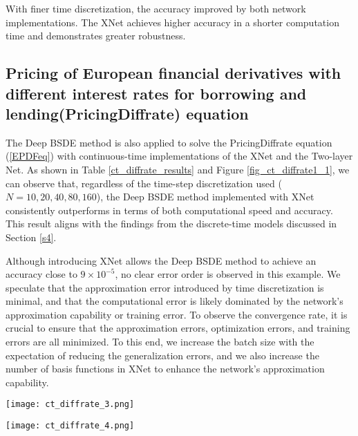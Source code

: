 \documentclass[11pt]{article}
\begin{document}
With finer time discretization, the accuracy improved by both network implementations. The XNet achieves higher accuracy in a shorter computation time and demonstrates greater robustness.




\subsection{Pricing of European financial derivatives with different interest rates for borrowing and lending(PricingDiffrate) equation}

The Deep BSDE method is also applied to solve the PricingDiffrate equation (\ref{EPDFeq}) with continuous-time implementations of the XNet and the Two-layer Net.
As shown in Table \ref{ct_diffrate_results} and Figure \ref{fig_ct_diffrate1_1}, we can observe that, regardless of the time-step discretization used ($N=10, 20, 40, 80, 160$), the Deep BSDE method implemented with XNet consistently outperforms in terms of both computational speed and accuracy. This result aligns with the findings from the discrete-time models discussed in Section \ref{s4}. 

Although introducing XNet allows the Deep BSDE method to achieve an accuracy close to $9 \times 10^{-5}$, no clear error order is observed in this example. We speculate that the approximation error introduced by time discretization is minimal, and that the computational error is likely dominated by the network's approximation capability or training error. To observe the convergence rate, it is crucial to ensure that the  approximation errors, optimization errors, and training errors are all minimized.
To this end, we increase the batch size with the expectation of reducing the generalization errors, and we also increase the number of basis functions in XNet to enhance the network's approximation capability.

\begin{figure*}
	\centering
	\begin{minipage}[t]{0.5\linewidth}
		\centering
		\texttt{[image: ct\_diffrate\_3.png]}
		\label{fig_ct_diffrate_20:first}
	\end{minipage}%
	\hfill
	\begin{minipage}[t]{0.5\linewidth}
		\centering
		\texttt{[image: ct\_diffrate\_4.png]}
		\label{fig_ct_diffrate_20:second}
	\end{minipage}
	\vspace{-0.7cm}
	\centering
	\caption{Comparison of Two Network Architectures for Solving the PricingDiddrate under 10-time-step and 160-time-step Discretization}
	\label{fig_ct_diffrate1_1}
\end{figure*}
\end{document}
